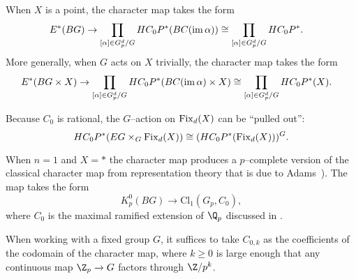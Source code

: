 \begin{example} \label{trivG}
When $X$ is a point, the character map takes the form
\begin{align*}
E^*(BG) & \to \prod_{[\alpha] \in G_{p}^{d}/G} HC_0P^*(BC(\operatorname{im} \alpha)) \cong \prod_{[\alpha] \in G_{p}^{d}/G} HC_0P^*.
\end{align*}
More generally, when $G$ acts on $X$ trivially, the character map takes the form
\begin{align*}
E^*(BG \times X) & \to \prod_{[\alpha] \in G_{p}^{d}/G} HC_{0}P^{*}(BC(\operatorname{im} \alpha) \times X) \cong \prod_{[\alpha] \in G_{p}^{d}/G} HC_{0}P^{*}(X).
\end{align*}
\end{example}

Because $C_0$ is rational, the $G$--action on $\operatorname{Fix}_d(X)$ can be ``pulled out'':
\[
HC_{0}P^*(EG \times_G \operatorname{Fix}_d(X)) \cong (HC_{0}P^*(\operatorname{Fix}_d(X)))^G.
\]



\begin{example}
When $n=1$ and $X = *$ the character map produces a $p$--complete version of the classical character map from representation theory that is due to Adams~\cite[Section 2]{Adams-Maps2}). The map takes the form
\[
K_{p}^{0}(BG) \xrightarrow{} \mathrm{Cl}_1(G_p, C_0),
\]
where $C_0$ is the maximal ramified extension of $\Q_p$ discussed in .
\end{example}

\begin{remark}
When working with a fixed group $G$, it suffices to take $C_{0,k}$ as the coefficients of the codomain of the character map, where $k \geq 0$ is large enough that any continuous map $\Z_p \xrightarrow{} G$ factors through $\Z/p^k$.
\end{remark}


